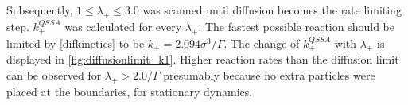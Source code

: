 \documentclass[
  a4paper,BCOR10mm,twoside,
  headsepline,footsepline,%
  fleqn,openbib
]{scrbook}
\begin{document}
Subsequently,  $1\leq\lambda_+\leq3.0$ was scanned until diffusion becomes the rate limiting step. $k^{QSSA}_{+}$ was calculated for every $\lambda_+$. The fastest possible reaction should be limited by \cref{difkinetics} to be $k_+=2.094 \sigma^3/\Gamma$. The change of $k^{QSSA}_{+}$ with $\lambda_+$ is displayed in \cref{fig:diffusionlimit_k1}. Higher reaction rates than the diffusion limit can be observed for $\lambda_+>2.0 /\Gamma$ presumably because no extra particles were placed at the boundaries, for stationary dynamics. 

 \newpage
\end{document}
